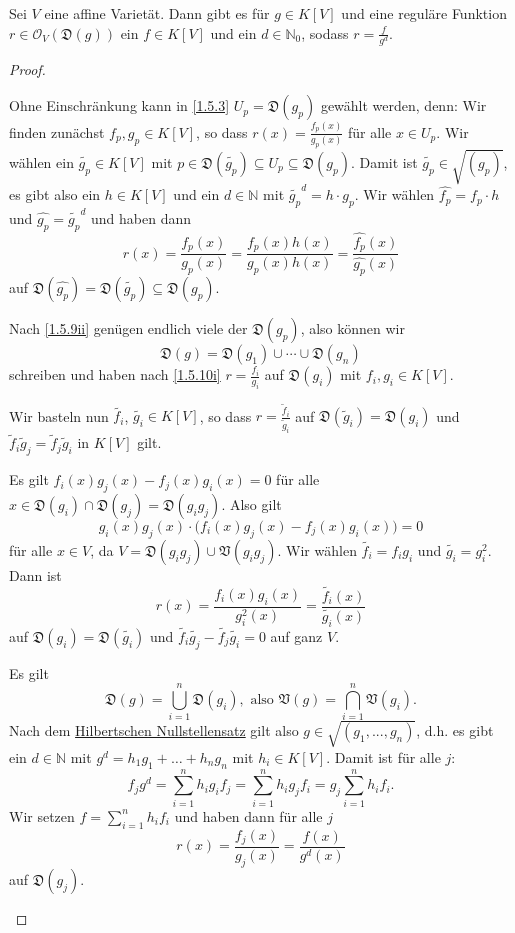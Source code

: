 \documentclass[a4paper,12pt,index=toc]{scrbook}
\theoremstyle{keinenummern} %
\def\V{\mathfrak{V}}
\def\O{\mathcal{O}}
\newcommand{\D}{\mathfrak{D}}
\renewcommand{\dotsc}{\ensuremath{\!...}}
\newcommand{\schlange}[1]{\widetilde{#1}}
\newcommand{\set}[1]{\ensuremath{\mathbb{#1}}}
\newcommand{\N}{\set{N}}
\newcommand{\dach}{\widehat}
\begin{document}
\begin{prop}\label{1.5.10}
  Sei $V$ eine affine Varietät. Dann gibt es für $g\in K[V]$ und eine reguläre Funktion $r\in\O_V(\D(g))$ ein $f\in K[V]$ und ein
  $d\in\N_0$, sodass $r=\frac{f}{g^d}$.
\end{prop}
\begin{proof}
  \begin{prooflist}
  \item{} Ohne Einschränkung kann in \cref{1.5.3} $U_p=\D(g_p)$ gewählt werden, denn: Wir finden zunächst $f_{p},g_{p}\in K[V]$, so dass
    $r(x)=\frac{f_p(x)}{g_p(x)}$ für alle $x\in U_p$. Wir wählen ein $\schlange{g_p}\in K[V]$ mit $p\in \D(\schlange{g_p})\subseteq U_{p}\subseteq \D(g_{p})$. Damit ist $\schlange{g_p}\in\sqrt{(g_p)}$, es gibt also ein $h\in K[V]$ und ein $d\in\N$
    mit $\schlange{g_p}^{d}=h\cdot g_p$. Wir wählen $\dach{f_{p}}=f_p\cdot h$ und $\dach{g_p}=\schlange{g_p}^d$ und haben
    dann \[r(x)=\frac{f_p(x)}{g_p(x)} = \frac{f_p(x)h(x)}{g_p(x)h(x)} = \frac{\dach{f_p}(x)}{\dach{g_p}(x)}\]
    auf $\D(\dach{g_p})=\D(\schlange{g_p})\subseteq \D(g_p)$.
  \item Nach \cref{1.5.9ii} genügen endlich viele der $\D(g_p)$, also können wir \[\D(g)=\D(g_1)\cup\dotsm\cup
    \D(g_n)\] schreiben und haben nach \ref{1.5.10i} $r=\frac{f_i}{g_i}$ auf $\D(g_i)$ mit $f_i,g_i\in K[V]$.

     Wir basteln nun $\schlange{f_i}$, $\schlange{g_i}\in K[V]$, so dass $r=\frac{\schlange{f}_i}{\schlange{g}_i}$ auf $\D(\schlange{g}_i)=\D(g_i)$ und
      $\schlange{f}_i\schlange{g}_j=\schlange{f}_j\schlange{g}_i$ in $K[V]$ gilt.

    Es gilt $f_i(x)g_j(x)-f_j(x)g_i(x)=0$ für alle $x\in \D(g_i)\cap \D(g_j)=\D(g_ig_j)$. Also gilt
    \[g_i(x)g_j(x)\cdot\bigl(f_i(x)g_j(x)-f_j(x)g_i(x)\bigr)=0\] für alle $x\in V$, da $V=\D(g_ig_j)\cup\V(g_ig_j)$. Wir wählen
    $\schlange{f_i}=f_ig_i$ und $\schlange{g_i}=g_i^2$. Dann ist \[r(x)=\frac{f_i(x)g_i(x)}{g_i^2(x)} =
    \frac{\schlange{f_i}(x)}{\schlange{g_i}(x)}\] auf $\D(g_i)=\D(\schlange{g_i})$ und $\schlange{f_i}\schlange{g_j}-\schlange{f_j}\schlange{g_i}=0$ auf
    ganz $V$.

    Es gilt \[\D(g)=\bigcup_{i=1}^n \D(g_i),\text{ also }\V(g)=\bigcap_{i=1}^n\V(g_i).\] Nach dem \hyperref[HNS]{Hilbertschen Nullstellensatz}
    gilt also $g\in\sqrt{(g_1,\dotsc,g_n)}$, d.h. es gibt ein $d\in\N$ mit $g^d=h_1g_1+\dotso+h_ng_n$ mit
    $h_i\in K[V]$. Damit ist für alle $j$:
    \[ f_jg^d = \sum_{i=1}^nh_ig_if_j = \sum_{i=1}^n h_ig_jf_i = g_j\sum_{i=1}^nh_if_i. \]
    Wir setzen $f=\displaystyle\sum_{i=1}^nh_if_i$ und haben dann für alle $j$ \[r(x)=\frac{f_j(x)}{g_j(x)}=\frac{f(x)}{g^d(x)}\]
    auf $\D(g_j)$.
  \end{prooflist}
\end{proof}
\end{document}

